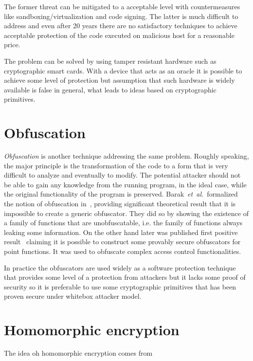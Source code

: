 \documentclass[11pt,oneside,final]{fithesis2}
\newcommand{\eal}{\emph{et~al.}}
\begin{document}
    The former threat can be mitigated to a acceptable level with countermeasures like sandboxing/virtualization and code signing. The latter is much difficult to address 
    and even after 20 years there are no satisfactory techniques to achieve acceptable protection of the code executed on malicious host for a reasonable price.
    
    The problem can be solved by using tamper resistant hardware such as cryptographic smart cards. With a device that acts as an oracle it is possible to achieve some
    level of protection but assumption that such hardware is widely available is false in general, what leads to ideas based on cryptographic primitives.
    
    \section{Obfuscation}
    
    \emph{Obfuscation} is another technique addressing the same problem. Roughly speaking, the major principle is the transformation of the code to a form that is very difficult 
    to analyze and eventually to modify. The potential attacker should not be able to gain any knowledge from the running program, in the ideal case, while the original functionality 
    of the program is preserved. Barak~\eal~formalized the notion of obfuscation in~\citep{Barak:2012:POP:2160158.2160159}, providing significant theoretical result
    that it is impossible 
    to create a generic obfuscator. They did so by showing the existence of a family of functions that are unobfuscatable, i.e. the family of functions always leaking some information. On the other hand
    later was published first positive result~\citep{Lynn04positiveresults} claiming it is possible to construct some provably secure obfuscators for point functions.
    It was used to obfuscate complex access control functionalities.
    
    In practice the obfuscators are used widely as a software protection technique that provides some level of a protection from attackers but it lacks some 
    proof of security so it is preferable to use some cryptographic primitives that has been proven secure under whitebox attacker model.
    
\section{Homomorphic encryption}
    The idea oh homomorphic encryption comes from 
    
\end{document}

